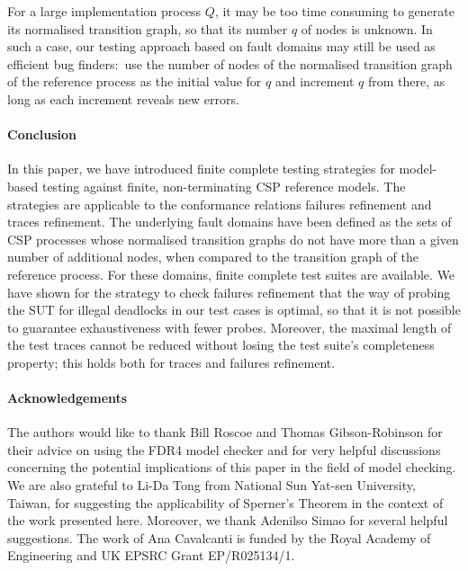 For a large implementation process $Q$, it may be too time consuming to
generate its normalised transition graph, so that its number $q$ of nodes is
unknown. In such a case, our testing approach based on fault domains may
still be used as efficient bug finders:~use the number of nodes of the
normalised transition graph of the reference process as the initial value for
$q$ and increment $q$ from there, as long as each increment reveals new
errors.

\paragraph{Conclusion}
In this paper, we have introduced finite complete testing strategies for
model-based testing against finite, non-terminating CSP reference models. The
strategies are applicable to the conformance relations failures refinement
and traces refinement. The underlying fault domains have been defined as the
sets of CSP processes whose normalised transition graphs do not have more
than a given number of additional nodes, when compared to the transition
graph of the reference process. For these domains, finite complete test
suites are available. We have shown for the strategy to check failures
refinement that the way of probing the SUT for illegal deadlocks in our test
cases is optimal, so that it is not possible to guarantee exhaustiveness with
fewer probes. Moreover, the maximal length of the test traces cannot be
reduced without losing the test suite's completeness property; this holds
both for traces and failures refinement.


\paragraph{Acknowledgements}
The authors would like to thank Bill Roscoe and Thomas Gibson-Robinson for
their advice on using the FDR4 model checker and for very helpful discussions
concerning the potential implications of this paper in the field of model
checking. We are also grateful to Li-Da Tong from National Sun Yat-sen
University, Taiwan, for suggesting the applicability of Sperner's Theorem in
the context of the work presented here. Moreover, we thank Adenilso Simao for
several helpful suggestions. The work of Ana Cavalcanti is funded by the
Royal Academy of Engineering and UK EPSRC Grant EP/R025134/1.
